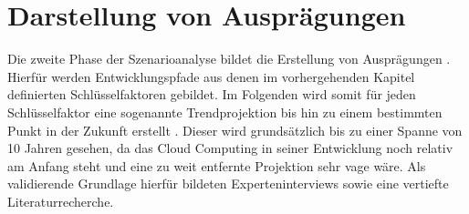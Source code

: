 \section{Darstellung von Ausprägungen}
\label{manifestations}

Die zweite Phase der Szenarioanalyse bildet die Erstellung von Ausprägungen \cite{spath}. Hierfür werden Entwicklungspfade aus denen im vorhergehenden Kapitel definierten Schlüsselfaktoren gebildet. Im Folgenden wird somit für jeden Schlüsselfaktor eine sogenannte Trendprojektion bis hin zu einem bestimmten Punkt in der Zukunft erstellt \cite{mietzner}. Dieser wird grundsätzlich bis zu einer Spanne von 10 Jahren gesehen, da das Cloud Computing in seiner Entwicklung noch relativ am Anfang steht und eine zu weit entfernte Projektion sehr vage wäre. Als validierende Grundlage hierfür bildeten Experteninterviews sowie eine vertiefte Literaturrecherche.

